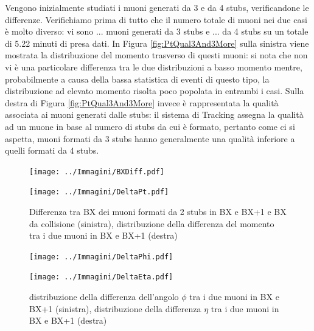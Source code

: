 Vengono inizialmente studiati i muoni generati da 3 e da 4 stubs, verificandone le differenze. Verifichiamo prima di tutto che il numero totale di muoni nei due casi è molto diverso: vi sono ... muoni generati da 3 stubs e ... da 4 stubs su un totale di 5.22 minuti di presa dati. In Figura \ref{fig:PtQual3And3More} sulla sinistra viene mostrata la distribuzione del momento trasverso di questi muoni: si nota che non vi è una particolare differenza tra le due distribuzioni a basso momento mentre, probabilmente a causa della bassa statistica di eventi di questo tipo, la distribuzione ad elevato momento risolta poco popolata in entrambi i casi. Sulla destra di Figura \ref{fig:PtQual3And3More} invece è rappresentata la qualità associata ai muoni generati dalle stubs: il sistema di Tracking assegna la qualità ad un muone in base al numero di stubs da cui è formato, pertanto come ci si aspetta, muoni formati da 3 stubs hanno generalmente una qualità inferiore a quelli formati da 4 stubs.

\begin{figure}[t]
  \centering
  \begin{minipage}[b]{0.48\textwidth}
    \centering
    \texttt{[image: ../Immagini/BXDiff.pdf]} 
    \end{minipage}
    \hfill 
    \begin{minipage}[b]{0.48\textwidth}
      \centering
      \texttt{[image: ../Immagini/DeltaPt.pdf]} 
    \end{minipage}
    \caption{Differenza tra BX dei muoni formati da 2 stubs in BX e BX+1 e BX da collisione (sinistra), distribuzione della differenza del momento tra i due muoni in BX e BX+1 (destra)  }
  \label{fig:BXDiffAndPt}
\end{figure}

\begin{figure}[t]
  \centering
  \begin{minipage}[b]{0.48\textwidth}
    \centering
    \texttt{[image: ../Immagini/DeltaPhi.pdf]} 
    \end{minipage}
    \hfill 
    \begin{minipage}[b]{0.48\textwidth}
      \centering
      \texttt{[image: ../Immagini/DeltaEta.pdf]} 
    \end{minipage}
    \caption{ distribuzione della differenza dell'angolo $\phi$ tra i due muoni in BX e BX+1 (sinistra), distribuzione della differenza $\eta$ tra i due muoni in BX e BX+1 (destra)}
  \label{fig:DeltaETaDeltaPhi}
\end{figure}

